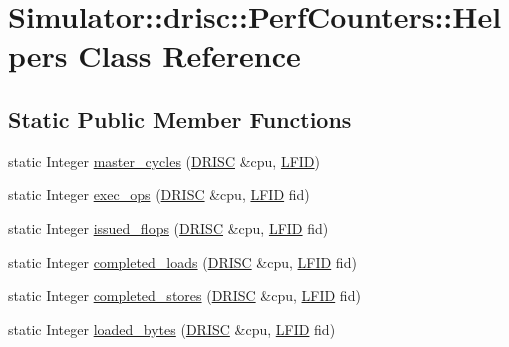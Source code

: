 \hypertarget{class_simulator_1_1drisc_1_1_perf_counters_1_1_helpers}{\section{Simulator\+:\+:drisc\+:\+:Perf\+Counters\+:\+:Helpers Class Reference}
\label{class_simulator_1_1drisc_1_1_perf_counters_1_1_helpers}
}
\subsection*{Static Public Member Functions}
\begin{DoxyCompactItemize}
\item 
static Integer \hyperlink{class_simulator_1_1drisc_1_1_perf_counters_1_1_helpers_aea174562c420543a2ec4f796b9de8cc2}{master\+\_\+cycles} (\hyperlink{class_simulator_1_1_d_r_i_s_c}{D\+R\+I\+S\+C} \&cpu, \hyperlink{namespace_simulator_aaccbc706b2d6c99085f52f6dfc2333e4}{L\+F\+I\+D})
\item 
static Integer \hyperlink{class_simulator_1_1drisc_1_1_perf_counters_1_1_helpers_ae4e15124c88d399f400bf34b3daff767}{exec\+\_\+ops} (\hyperlink{class_simulator_1_1_d_r_i_s_c}{D\+R\+I\+S\+C} \&cpu, \hyperlink{namespace_simulator_aaccbc706b2d6c99085f52f6dfc2333e4}{L\+F\+I\+D} fid)
\item 
static Integer \hyperlink{class_simulator_1_1drisc_1_1_perf_counters_1_1_helpers_a2ea667afd4d4098b8890bce2a206c8d3}{issued\+\_\+flops} (\hyperlink{class_simulator_1_1_d_r_i_s_c}{D\+R\+I\+S\+C} \&cpu, \hyperlink{namespace_simulator_aaccbc706b2d6c99085f52f6dfc2333e4}{L\+F\+I\+D} fid)
\item 
static Integer \hyperlink{class_simulator_1_1drisc_1_1_perf_counters_1_1_helpers_a3949956311f39bfaf73e240f2fa620d0}{completed\+\_\+loads} (\hyperlink{class_simulator_1_1_d_r_i_s_c}{D\+R\+I\+S\+C} \&cpu, \hyperlink{namespace_simulator_aaccbc706b2d6c99085f52f6dfc2333e4}{L\+F\+I\+D} fid)
\item 
static Integer \hyperlink{class_simulator_1_1drisc_1_1_perf_counters_1_1_helpers_a3dfbf25b61d2d19268f97a929feb12ad}{completed\+\_\+stores} (\hyperlink{class_simulator_1_1_d_r_i_s_c}{D\+R\+I\+S\+C} \&cpu, \hyperlink{namespace_simulator_aaccbc706b2d6c99085f52f6dfc2333e4}{L\+F\+I\+D} fid)
\item 
static Integer \hyperlink{class_simulator_1_1drisc_1_1_perf_counters_1_1_helpers_a31c2f3a794abe5997130e60d7d8743d0}{loaded\+\_\+bytes} (\hyperlink{class_simulator_1_1_d_r_i_s_c}{D\+R\+I\+S\+C} \&cpu, \hyperlink{namespace_simulator_aaccbc706b2d6c99085f52f6dfc2333e4}{L\+F\+I\+D} fid)

\end{DoxyCompactItemize}
